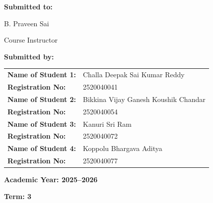 \begin{titlepage}
\begin{center}
        \vspace{0.15cm}
        
        {\bfseries Submitted to:\par}
        \vspace{0.05cm}
        B. Praveen Sai\par
        Course Instructor
    \end{center}
    
    \vspace{0.25cm}
    
    {\bfseries Submitted by:\par}
    \vspace{0.10cm}
    
    \renewcommand{\arraystretch}{1.1}
    \begin{tabularx}{\textwidth}{@{}>{\bfseries}p{4.6cm}X@{}}
    Name of Student 1: & Challa Deepak Sai Kumar Reddy \\
    Registration No: & 2520040041 \\
    Name of Student 2: & Bikkina Vijay Ganesh Koushik Chandar \\
    Registration No: & 2520040054 \\
    Name of Student 3: & Kanuri Sri Ram \\
    Registration No: & 2520040072 \\
    Name of Student 4: & Koppolu Bhargava Aditya \\
    Registration No: & 2520040077 \\
    \end{tabularx}
    
    \vfill
    
    \begin{center}
        {\bfseries Academic Year: 2025--2026\par}
        {\bfseries Term: 3\par}
    \end{center}
    
    \restoregeometry
\end{titlepage}